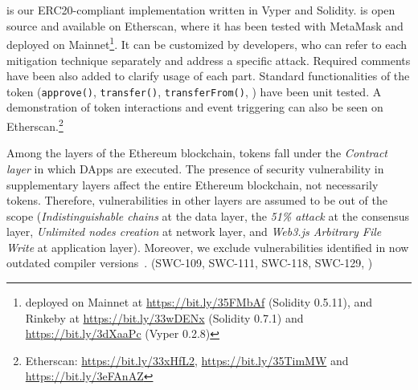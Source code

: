 

\section{\sys}\label{sec:proposal}
\sys is our ERC20-compliant implementation written in Vyper and Solidity. \sys is open source and available on Etherscan, where it has been tested with MetaMask and deployed on Mainnet\footnote{\sys deployed on Mainnet at \url{https://bit.ly/35FMbAf} (Solidity 0.5.11), and Rinkeby at \url{https://bit.ly/33wDENx} (Solidity 0.7.1) and \url{https://bit.ly/3dXaaPc} (Vyper 0.2.8)}. It can be customized by developers, who can refer to each mitigation technique separately and address a specific attack. Required comments have been also added to clarify usage of each part. Standard functionalities of the token (\ie \texttt{approve()}, \texttt{transfer()}, \texttt{transferFrom()}, \etc) have been unit tested. A demonstration of token interactions and event triggering can also be seen on Etherscan.\footnote{Etherscan: \url{https://bit.ly/33xHfL2}, \url{https://bit.ly/35TimMW} and \url{https://bit.ly/3eFAnAZ}}

Among the layers of the Ethereum blockchain, \erc tokens fall under the \textit{Contract layer} in which DApps are executed. The presence of security vulnerability in supplementary layers affect the entire Ethereum blockchain, not necessarily \erc tokens. Therefore, vulnerabilities in other layers are assumed to be out of the scope (\eg \textit{Indistinguishable chains} at the data layer, the \textit{51\% attack} at the consensus layer, \textit{Unlimited nodes creation} at network layer, and \textit{Web3.js Arbitrary File Write} at application layer). Moreover, we exclude vulnerabilities identified in now outdated compiler versions~\cite{SWC}. (\eg SWC-109, SWC-111, SWC-118, SWC-129, \etc)



